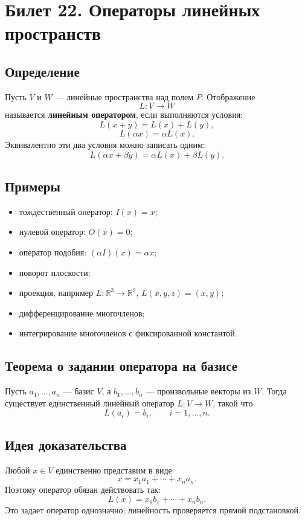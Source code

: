 \documentclass[12pt,a4paper]{article}
\begin{document}
\section{Билет 22. Операторы линейных пространств}

\subsection*{Определение}

Пусть $V$ и $W$ --- линейные пространства над полем $P$. Отображение
\[
    L:V\to W
\]
называется \textbf{линейным оператором}, если выполняются условия:
\[
    L(x+y)=L(x)+L(y),
\]
\[
    L(\alpha x)=\alpha L(x).
\]
Эквивалентно эти два условия можно записать одним:
\[
    L(\alpha x+\beta y)=\alpha L(x)+\beta L(y).
\]

\subsection*{Примеры}

\begin{itemize}
    \item тождественный оператор: $I(x)=x$;
    \item нулевой оператор: $O(x)=0$;
    \item оператор подобия: $(\alpha I)(x)=\alpha x$;
    \item поворот плоскости;
    \item проекция, например $L:\mathbb{R}^{3}\to\mathbb{R}^{2}$, $L(x,y,z)=(x,y)$;
    \item дифференцирование многочленов;
    \item интегрирование многочленов с фиксированной константой.
\end{itemize}

\subsection*{Теорема о задании оператора на базисе}

Пусть $a_1,\ldots,a_n$ --- базис $V$, а $b_1,\ldots,b_n$ --- произвольные векторы из $W$. Тогда существует единственный линейный оператор $L:V\to W$, такой что
\[
    L(a_i)=b_i,\qquad i=1,\ldots,n.
\]

\subsection*{Идея доказательства}

Любой $x\in V$ единственно представим в виде
\[
    x=x_1a_1+\cdots+x_na_n.
\]
Поэтому оператор обязан действовать так:
\[
    L(x)=x_1b_1+\cdots+x_nb_n.
\]
Это задает оператор однозначно; линейность проверяется прямой подстановкой.
\end{document}

